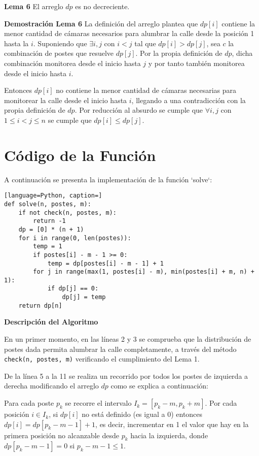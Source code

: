 \documentclass{article}
\begin{document}
\textbf{Lema 6}
El arreglo \( dp \) es no decreciente.

\textbf{Demostración Lema 6}
La definición del arreglo plantea que \( dp[i] \) contiene la menor cantidad de cámaras necesarios para alumbrar la calle desde la posición 1 hasta la \( i \). Suponiendo que \( \exists i, j \) con \( i < j \) tal que \( dp[i] > dp[j] \), sea \( c \) la combinación de postes que resuelve \( dp[j] \). Por la propia definición de \( dp \), dicha combinación monitorea desde el inicio hasta \( j \) y por tanto también monitorea desde el inicio hasta \( i \). 

Entonces \( dp[i] \) no contiene la menor cantidad de cámaras necesarias para monitorear la calle desde el inicio hasta \( i \), llegando a una contradicción con la propia definición de \( dp \). Por reducción al absurdo se cumple que \( \forall i, j \) con \( 1 \leq i < j \leq n \) se cumple que \( dp[i] \leq dp[j] \).



\section*{Código de la Función}

A continuación se presenta la implementación de la función `solve`:



\begin{lstlisting}[language=Python, caption=]
def solve(n, postes, m):
    if not check(n, postes, m):
        return -1
    dp = [0] * (n + 1)
    for i in range(0, len(postes)):
        temp = 1
        if postes[i] - m - 1 >= 0:
            temp = dp[postes[i] - m - 1] + 1
        for j in range(max(1, postes[i] - m), min(postes[i] + m, n) + 1):
            if dp[j] == 0:
                dp[j] = temp
    return dp[n]
\end{lstlisting}


\textbf{Descripción del Algoritmo}

En un primer momento, en las líneas 2 y 3 se comprueba que la distribución de postes dada permita alumbrar la calle completamente, a través del método \texttt{check(n, postes, m)} verificando el cumplimiento del Lema 1.

De la línea 5 a la 11 se realiza un recorrido por todos los postes de izquierda a derecha modificando el arreglo \( dp \) como se explica a continuación:

Para cada poste \( p_k \) se recorre el intervalo \( I_k = [p_k - m, p_k + m] \). Por cada posición \( i \in I_k \), si \( dp[i] \) no está definido (es igual a 0) entonces \( dp[i] = dp[p_k - m - 1] + 1 \), es decir, incrementar en 1 el valor que hay en la primera posición no alcanzable desde \( p_k \) hacia la izquierda, donde \( dp[p_k - m - 1] = 0 \) si \( p_k - m - 1 \leq 1 \).
\end{document}
